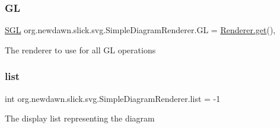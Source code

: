 \subsubsection{\texorpdfstring{GL}{GL}}
{\footnotesize\ttfamily \mbox{\hyperlink{interfaceorg_1_1newdawn_1_1slick_1_1opengl_1_1renderer_1_1_s_g_l}{S\+GL}} org.\+newdawn.\+slick.\+svg.\+Simple\+Diagram\+Renderer.\+GL = \mbox{\hyperlink{classorg_1_1newdawn_1_1slick_1_1opengl_1_1renderer_1_1_renderer_abe742c3a7dfca67c6c01821d27087308}{Renderer.\+get}}()\hspace{0.3cm}{\ttfamily [static]}, {\ttfamily [protected]}}

The renderer to use for all GL operations \mbox{\label{classorg_1_1newdawn_1_1slick_1_1svg_1_1_simple_diagram_renderer_a48000603b4c3624a604096f01f5d58d0}} 
\subsubsection{\texorpdfstring{list}{list}}
{\footnotesize\ttfamily int org.\+newdawn.\+slick.\+svg.\+Simple\+Diagram\+Renderer.\+list = -\/1}

The display list representing the diagram 